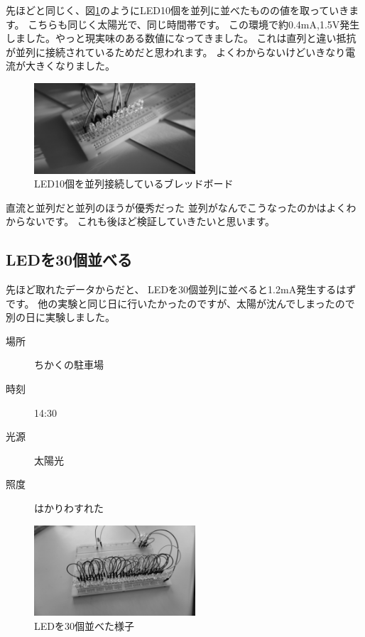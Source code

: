 先ほどと同じく、図\ref{fig:led_par10}のようにLED10個を並列に並べたものの値を取っていきます。
こちらも同じく太陽光で、同じ時間帯です。
この環境で約0.4\si{\milli\ampere},1.5$\si\volt$発生しました。やっと現実味のある数値になってきました。
これは直列と違い抵抗が並列に接続されているためだと思われます。
よくわからないけどいきなり電流が大きくなりました。


\begin{figure}[htbp]
    \centering
    \includegraphics[width=60mm]{./assets/mouse/gray/5.JPG}
    \caption{LED10個を並列接続しているブレッドボード}
    \label{fig:led_par10}
\end{figure}

直流と並列だと並列のほうが優秀だった
並列がなんでこうなったのかはよくわからないです。
これも後ほど検証していきたいと思います。

\subsection{LEDを30個並べる}

先ほど取れたデータからだと、
LEDを30個並列に並べると1.2\si{\milli\ampere}発生するはずです。
他の実験と同じ日に行いたかったのですが、太陽が沈んでしまったので別の日に実験しました。

\begin{description}
  \item[場所]{ちかくの駐車場}
  \item[時刻]{14:30}
  \item[光源]{太陽光}
  \item[照度]{はかりわすれた}
\end{description}


\begin{figure}[htbp]
    \centering
    \includegraphics[width=60mm]{./assets/mouse/gray/10.JPG}
    \caption{LEDを30個並べた様子}
    \label{fig:led_par30}
\end{figure}

